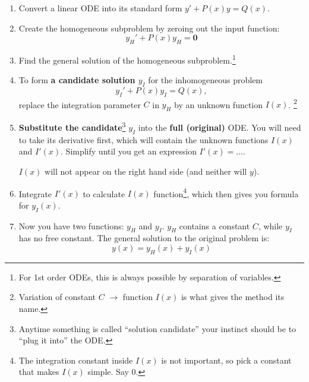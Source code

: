   \begin{enumerate}
  \item Convert a linear ODE into its standard form \(y' + P(x) y = Q(x)\).
  \item Create the homogeneous subproblem by zeroing out the input function:
      \[y_{H}' + P(x) y_{H} = \textbf{0}\]
    \item Find the general solution of the homogeneous subproblem.\footnote{For 1st order ODEs, this is always possible by separation of variables.}
    \item To form \textbf{a candidate solution \(y_{I}\)} for the inhomogeneous problem 
    \begin{equation}
    y_{I}' + P(x) y_{I} = Q(x),
    \end{equation}
    replace the integration parameter \(C\) in \(y_{H}\) by an unknown function \(I(x)\). \footnote{Variation of constant \(C\) \(\to\) function \(I(x)\) is what gives the method its name.}
    \item \textbf{Substitute the candidate}\footnote{Anytime something is called ``solution candidate'' your instinct should be to ``plug it into'' the ODE.} \(y_{I}\) into the \textbf{full (original)} ODE. You will need to take its derivative first, which will contain the unknown functions \(I(x)\) and \(I'(x)\). Simplify until you get an expression \(I'(x) = \dots\).

 \(I(x)\) will not appear on the right hand side (and neither will \(y\)).
    \item Integrate \(I'(x)\) to calculate \(I(x)\) function\footnote{The integration constant inside \(I(x)\) is not important, so pick a constant that makes \(I(x)\) simple. Say \(0\).}, which then gives you formula for \(y_{I}(x)\).
    \item Now you have two functions: \(y_{H}\) and \(y_{I}\). \(y_{H}\) contains a constant \(C\), while \(y_{I}\) has no free constant. The general solution to the original problem is:
      \[
        y(x) = y_{H}(x) + y_{I}(x)
      \]
    \end{enumerate}

